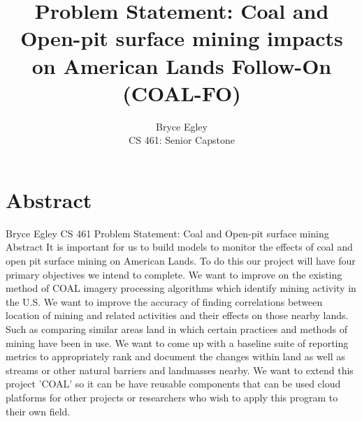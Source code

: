 \documentclass{article}
\begin{document}

\title{Problem Statement: Coal and Open-pit surface mining impacts on American
Lands Follow-On (COAL-FO)}
\author{Bryce Egley\\CS 461: Senior Capstone} %

\maketitle

%
%

\section*{Abstract}
Bryce Egley
\newline
CS 461 Problem Statement: Coal and Open-pit surface mining
\newline
Abstract
\newline
It is important for us to build models to monitor the effects of coal and open
pit surface mining on American Lands. To do this our project will have four
primary objectives we intend to complete.
We want to improve on the existing method of COAL imagery processing algorithms
which identify mining activity in the U.S.
We want to improve the accuracy of finding correlations between location of
mining and related activities and their effects on those nearby lands. Such as
comparing similar areas land in which certain practices and methods of mining
have been in use.
We want to come up with a baseline suite of reporting metrics to appropriately
rank and document the changes within land as well as streams or other natural
barriers and landmasses nearby.
We want to extend this project 'COAL' so it can be have reusable components
that can be used cloud platforms for other projects or researchers who wish to
apply this program to their own field.
\end{document}
